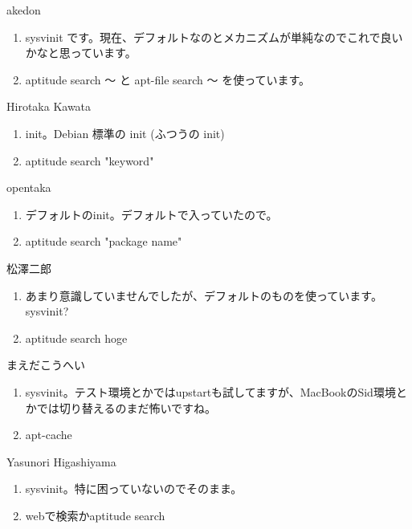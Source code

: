 \begin{prework}{ akedon }

\begin{enumerate}
\item sysvinit です。現在、デフォルトなのとメカニズムが単純なのでこれで良いかなと思っています。
\item aptitude search 〜 と apt-file search 〜 を使っています。
\end{enumerate}
\end{prework}

\begin{prework}{ Hirotaka Kawata }

\begin{enumerate}
\item init。Debian 標準の init (ふつうの init)
\item aptitude search "keyword"
\end{enumerate}
\end{prework}

\begin{prework}{ opentaka }

\begin{enumerate}
\item デフォルトのinit。デフォルトで入っていたので。
\item aptitude search "package name"
\end{enumerate}
\end{prework}

\begin{prework}{ 松澤二郎 }
\begin{enumerate}
\item あまり意識していませんでしたが、デフォルトのものを使っています。sysvinit?
\item aptitude search hoge
\end{enumerate}
\end{prework}

\begin{prework}{ まえだこうへい }

\begin{enumerate}
\item sysvinit。テスト環境とかではupstartも試してますが、MacBookのSid環境とかでは切り替えるのまだ怖いですね。
\item apt-cache
\end{enumerate}
\end{prework}

\begin{prework}{ Yasunori Higashiyama }

\begin{enumerate}
\item sysvinit。特に困っていないのでそのまま。
\item webで検索かaptitude search
\end{enumerate}
\end{prework}

